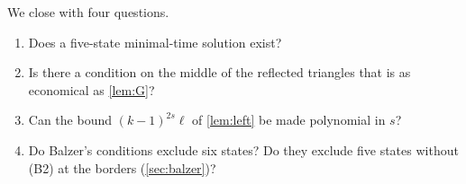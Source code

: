 We close with four questions.
\begin{enumerate}[(1)]
\item Does a five-state minimal-time solution exist?
\item Is there a condition on the middle of the reflected triangles that is as
economical as \cref{lem:G}?
\item Can the bound $(k-1)^{2s}\ell$ of \cref{lem:left} be made polynomial in
$s$?
\item Do Balzer's conditions exclude six states? Do they exclude five states
without (B2) at the borders (\cref{sec:balzer})?
\end{enumerate}

